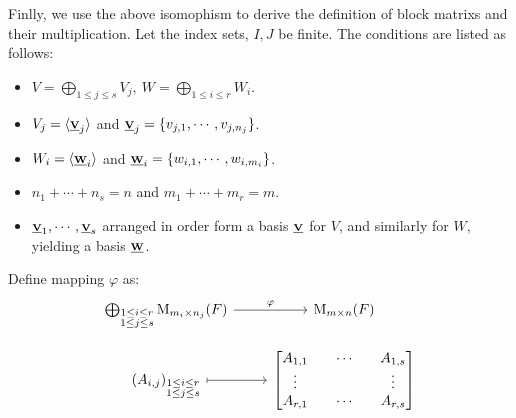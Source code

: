 Finlly, we use the above isomophism to derive the definition of block matrixs and their multiplication. Let the index sets, $I, J$ be finite. The conditions are listed as follows:
\begin{itemize}
    \item $V = \bigoplus_{1 \leq j \leq s} V_j,\ W = \bigoplus_{1 \leq i \leq r} W_i$.
    \item $V_j = \lag \bs{V}{j} \rag$ and $\bs{V}{j} = \{ v_{j,1}, \cdots, v_{j, n_j} \}$.
    \item $W_i = \lag \bs{W}{i} \rag$ and $\bs{W}{i} = \{ w_{i,1}, \cdots, w_{i, m_i} \}$.
    \item $n_1 + \cdots + n_s = n$ and $m_1 + \cdots + m_r = m$.
    \item $\bs{V}{1}, \cdots, \bs{V}{s}$ arranged in order form a basis $\bs{V}{}$ for $V$, and similarly for $W$, yielding a basis $\bs{W}{}$. 
\end{itemize}
Define mapping $\varphi$ as:
\[
    \begin{tikzcd}[row sep=small]
        \bigoplus_{\substack{1 \leq i \leq r \\ 1 \leq j \leq s}}\Mat_{m_i \times n_j}(F) \arrow[r, "\varphi"]
        & \Mat_{m \times n}(F) \\
        (A_{i, j})_{\substack{1 \leq i \leq r \\ 1 \leq j \leq s}} \arrow[mapsto, r]
        & \begin{bmatrix}
            A_{1, 1} & \cdots & A_{1, s} \\
            \vdots & & \vdots \\
            A_{r, 1} & \cdots & A_{r, s}
        \end{bmatrix}
    \end{tikzcd}
\]



